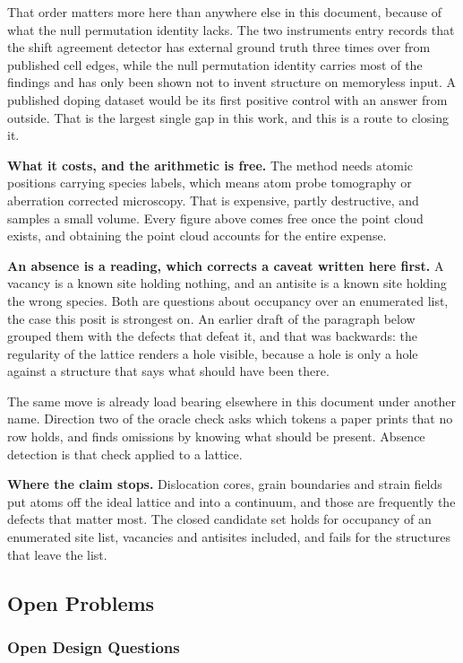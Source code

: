 That order matters more here than anywhere else in this document, because of what the null permutation identity lacks. The two instruments entry records that the shift agreement detector has external ground truth three times over from published cell edges, while the null permutation identity carries most of the findings and has only been shown not to invent structure on memoryless input. A published doping dataset would be its first positive control with an answer from outside. That is the largest single gap in this work, and this is a route to closing it.

\textbf{What it costs, and the arithmetic is free.} The method needs atomic positions carrying species labels, which means atom probe tomography or aberration corrected microscopy. That is expensive, partly destructive, and samples a small volume. Every figure above comes free once the point cloud exists, and obtaining the point cloud accounts for the entire expense.

\textbf{An absence is a reading, which corrects a caveat written here first.} A vacancy is a known site holding nothing, and an antisite is a known site holding the wrong species. Both are questions about occupancy over an enumerated list, the case this posit is strongest on. An earlier draft of the paragraph below grouped them with the defects that defeat it, and that was backwards: the regularity of the lattice renders a hole visible, because a hole is only a hole against a structure that says what should have been there.

The same move is already load bearing elsewhere in this document under another name. Direction two of the oracle check asks which tokens a paper prints that no row holds, and finds omissions by knowing what should be present. Absence detection is that check applied to a lattice.

\textbf{Where the claim stops.} Dislocation cores, grain boundaries and strain fields put atoms off the ideal lattice and into a continuum, and those are frequently the defects that matter most. The closed candidate set holds for occupancy of an enumerated site list, vacancies and antisites included, and fails for the structures that leave the list.

\subsection{Open Problems}

\subsubsection{Open Design Questions}

